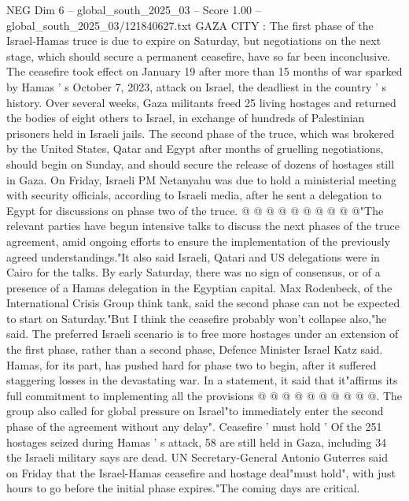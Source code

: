 \begin{textsample}{NEG Dim 6 – global\_south\_2025\_03 – Score 1.00 – global\_south\_2025\_03/121840627.txt}  \label{ex:f6_neg_224}
GAZA CITY : The first phase of the Israel-Hamas truce is due to expire on Saturday, but negotiations on the next stage, which should secure a permanent ceasefire, have so far been inconclusive.
The ceasefire took effect on January 19 after more than 15 months of war sparked by Hamas ' s October 7, 2023, attack on Israel, the deadliest in the country ' s history.
Over several weeks, Gaza militants freed 25 living hostages and returned the bodies of eight others to Israel, in exchange of hundreds of Palestinian prisoners held in Israeli jails.
The second phase of the truce, which was brokered by the United States, Qatar and Egypt after months of gruelling negotiations, should begin on Sunday, and should secure the release of dozens of hostages still in Gaza.
On Friday, Israeli PM Netanyahu was due to hold a ministerial meeting with security officials, according to Israeli media, after he sent a delegation to Egypt for discussions on phase two of the truce. @ @ @ @ @ @ @ @ @ @"The relevant parties have begun intensive talks to discuss the next phases of the truce agreement, amid ongoing efforts to ensure the implementation of the previously agreed understandings."It also said Israeli, Qatari and US delegations were in Cairo for the talks.
By early Saturday, there was no sign of consensus, or of a presence of a Hamas delegation in the Egyptian capital.
Max Rodenbeck, of the International Crisis Group think tank, said the second phase can not be expected to start on Saturday."But I think the ceasefire probably won't collapse also,"he said.
The preferred Israeli scenario is to free more hostages under an extension of the first phase, rather than a second phase, Defence Minister Israel Katz said.
Hamas, for its part, has pushed hard for phase two to begin, after it suffered staggering losses in the devastating war.
In a statement, it said that it"affirms its full commitment to implementing all the provisions @ @ @ @ @ @ @ @ @ @.
The group also called for global pressure on Israel"to immediately enter the second phase of the agreement without any delay".
Ceasefire ' must hold ' Of the 251 hostages seized during Hamas ' s attack, 58 are still held in Gaza, including 34 the Israeli military says are dead.
UN Secretary-General Antonio Guterres said on Friday that the Israel-Hamas ceasefire and hostage deal"must hold", with just hours to go before the initial phase expires."The coming days are critical.

\end{textsample}
